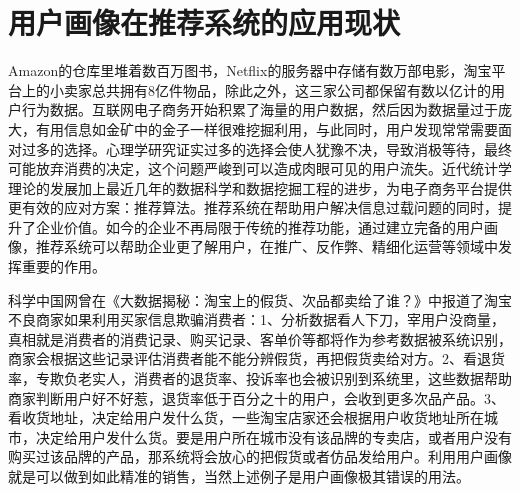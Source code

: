 	\section{用户画像在推荐系统的应用现状}
	Amazon的仓库里堆着数百万图书，Netflix的服务器中存储有数万部电影，淘宝平台上的小卖家总共拥有8亿件物品，除此之外，这三家公司都保留有数以亿计的用户行为数据。互联网电子商务开始积累了海量的用户数据，然后因为数据量过于庞大，有用信息如金矿中的金子一样很难挖掘利用，与此同时，用户发现常常需要面对过多的选择。心理学研究证实过多的选择会使人犹豫不决，导致消极等待，最终可能放弃消费的决定，这个问题严峻到可以造成肉眼可见的用户流失。近代统计学理论的发展加上最近几年的数据科学和数据挖掘工程的进步，为电子商务平台提供更有效的应对方案：推荐算法。推荐系统在帮助用户解决信息过载问题的同时，提升了企业价值。如今的企业不再局限于传统的推荐功能，通过建立完备的用户画像，推荐系统可以帮助企业更了解用户，在推广、反作弊、精细化运营等领域中发挥重要的作用。

	科学中国网曾在《大数据揭秘：淘宝上的假货、次品都卖给了谁？》中报道了淘宝不良商家如果利用买家信息欺骗消费者\citep{liar_taobao}：1、分析数据看人下刀，宰用户没商量，真相就是消费者的消费记录、购买记录、客单价等都将作为参考数据被系统识别，商家会根据这些记录评估消费者能不能分辨假货，再把假货卖给对方。2、看退货率，专欺负老实人，消费者的退货率、投诉率也会被识别到系统里，这些数据帮助商家判断用户好不好惹，退货率低于百分之十的用户，会收到更多次品产品。3、看收货地址，决定给用户发什么货，一些淘宝店家还会根据用户收货地址所在城市，决定给用户发什么货。要是用户所在城市没有该品牌的专卖店，或者用户没有购买过该品牌的产品，那系统将会放心的把假货或者仿品发给用户。利用用户画像就是可以做到如此精准的销售，当然上述例子是用户画像极其错误的用法。
